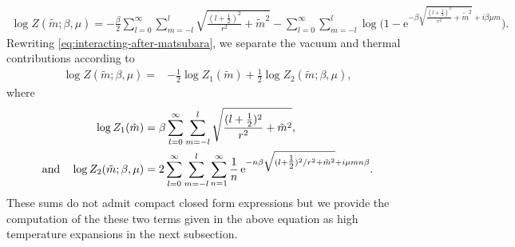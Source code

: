 \documentclass[a4paper,11pt]{article}
\newcommand{\e}{\mathrm e}
\begin{document}
\begin{align}
 \log Z(\tilde m;\beta,\mu)
 =-\frac{\beta}{2}
 \sum_{l=0}^{\infty}\sum_{m=-l}^{l}
 \sqrt{\frac{(l+\frac12)^2}{r^2}+\tilde m^2}
-\sum_{l=0}^{\infty}\sum_{m=-l}^{l}
 \log\!\Big(
 1-\e^{-\beta\sqrt{\frac{(l+\frac12)^2}{r^2}+\tilde m^2}+i\beta\mu m}
 \Big).
 \label{eq:interacting-after-matsubara}
\end{align}
Rewriting \eqref{eq:interacting-after-matsubara}, we separate the vacuum and
thermal contributions according to
\begin{align}
 \log Z(\tilde m;\beta,\mu)
 ={}&-\frac12\log Z_1(\tilde m)
 +\frac12\log Z_2(\tilde m;\beta,\mu),
 \label{eq:interacting-split}
\end{align}
where
\begin{align}
 \log Z_1(\tilde m)
 &=\beta\sum_{l=0}^{\infty}\sum_{m=-l}^{l}
 \sqrt{\frac{(l+\tfrac12)^2}{r^2}+\tilde m^2},
\nonumber\\
{\rm and}\quad \log Z_2(\tilde m;\beta,\mu)
 &=2\sum_{l=0}^{\infty}\sum_{m=-l}^{l}
 \sum_{n=1}^{\infty}\frac1n\,
 \e^{-n\beta\sqrt{(l+\tfrac12)^2/r^2+\tilde m^2}+i\mu mn\beta}.
 \label{eq:Z2-def}
\end{align}
These sums do not admit compact closed form expressions but we provide the computation of the these two terms given  in the above equation as high temperature expansions in the next subsection. 
\end{document}
